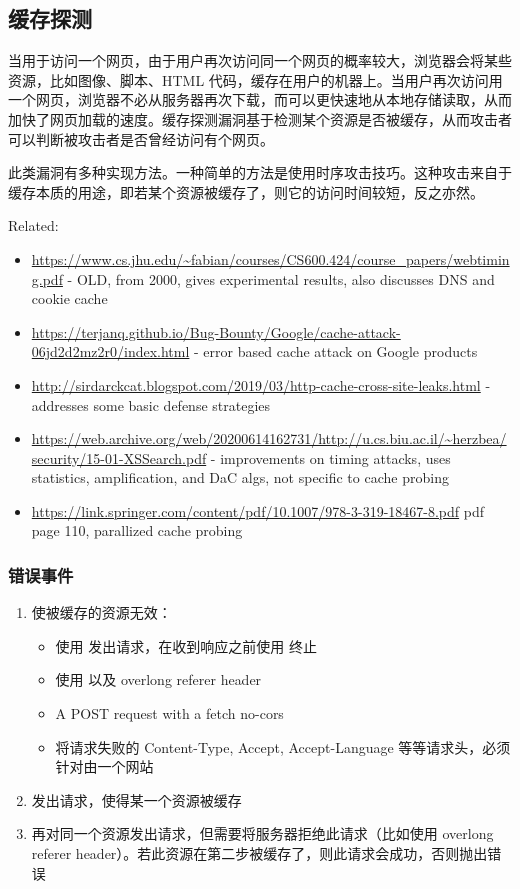 \subsection{缓存探测}

当用于访问一个网页，由于用户再次访问同一个网页的概率较大，浏览器会将某些资源，比如图像、脚本、HTML 代码，缓存在用户的机器上。当用户再次访问用一个网页，浏览器不必从服务器再次下载，而可以更快速地从本地存储读取，从而加快了网页加载的速度。缓存探测漏洞基于检测某个资源是否被缓存，从而攻击者可以判断被攻击者是否曾经访问有个网页。

此类漏洞有多种实现方法。一种简单的方法是使用时序攻击技巧。这种攻击来自于缓存本质的用途，即若某个资源被缓存了，则它的访问时间较短，反之亦然。


Related:

\begin{itemize}
    \item \url{https://www.cs.jhu.edu/~fabian/courses/CS600.424/course_papers/webtiming.pdf} - OLD, from 2000, gives experimental results, also discusses DNS and cookie cache
    \item \url{https://terjanq.github.io/Bug-Bounty/Google/cache-attack-06jd2d2mz2r0/index.html} - error based cache attack on Google products
    \item \url{http://sirdarckcat.blogspot.com/2019/03/http-cache-cross-site-leaks.html} - addresses some basic defense strategies
    \item \url{https://web.archive.org/web/20200614162731/http://u.cs.biu.ac.il/~herzbea/security/15-01-XSSearch.pdf} - improvements on timing attacks, uses statistics, amplification, and DaC algs, not specific to cache probing
    \item \url{https://link.springer.com/content/pdf/10.1007/978-3-319-18467-8.pdf} pdf page 110, parallized cache probing
\end{itemize}

\subsubsection{错误事件}

\begin{enumerate}
    \item 使被缓存的资源无效：
    \begin{itemize}
        \item 使用  发出请求，在收到响应之前使用  终止
        \item 使用  以及 overlong referer header
        \item A POST request with a fetch no-cors
        \item 将请求失败的 Content-Type, Accept, Accept-Language 等等请求头，必须针对由一个网站
    \end{itemize}
    \item 发出请求，使得某一个资源被缓存
    \item 再对同一个资源发出请求，但需要将服务器拒绝此请求（比如使用 overlong referer header）。若此资源在第二步被缓存了，则此请求会成功，否则抛出错误
\end{enumerate}

